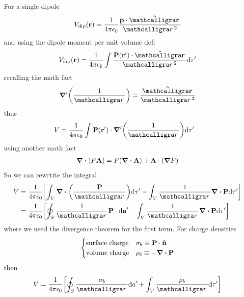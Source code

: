\documentclass[../main.tex]{subfiles}
\begin{document}
For a single dipole
\begin{align*}
    V_\text{dip}(\vb r) = \ke \frac{\vb p \cdot \vu \scriptr}{\scriptr^2}
\end{align*}
and using the dipole moment per unit volume def:
\begin{align*}
    V_\text{dip}(\vb r) = \ke \int \frac{\vb P(\vb r') \cdot \vu \scriptr}{\scriptr^2} \dd\tau'
\end{align*}
recalling the math fact
\begin{align*}
    \grad' \qt(\frac{1}{\scriptr}) = \frac{\vu \scriptr}{\scriptr^2}
\end{align*}
thus
\begin{align*}
    V &= \ke \int \vb P(\vb r') \cdot \grad' \qt(\frac{1}{\scriptr}) \dd\tau'
\end{align*}
using another math fact
\begin{align*}
    \div (F \vb A) = F(\div \vb A) + \vb A \cdot (\grad F)
\end{align*}
So we can rewrtite the integral
\begin{align*}
    V &= \ke \qt[
        \int_V \div(\frac{\vb P}{\scriptr}) \dd\tau' - \int_V \frac{1}{\scriptr} \div \vb P \dd\tau'
    ] \\
    &= \ke \qt[
        \oint_S \frac{1}{\scriptr} \vb P \cdot \dd \vb a' - \int_V \frac{1}{\scriptr} \div \vb P \dd\tau'
    ]
\end{align*}
where we used the divergence theorem for the first term. For charge densities
\begin{align*}
    \begin{cases}
        \textrm{surface charge} & \sigma_b \equiv \vb P \cdot \vu n \\
        \textrm{volume charge} & \rho_b \equiv -\div \vb P
    \end{cases}
\end{align*}
then
\begin{align*}
    V = \ke \qt[
        \oint_S \frac{\sigma_b}{\scriptr} \dd a' + \int_V \frac{\rho_b}{\scriptr} \dd\tau'
    ]
\end{align*}
\end{document}
